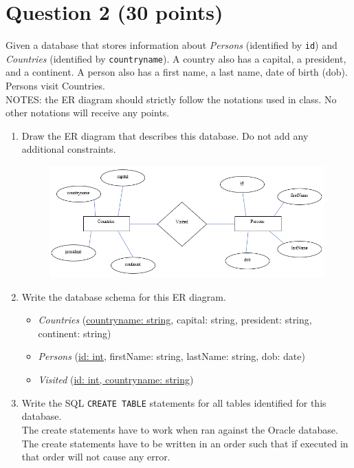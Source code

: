 \documentclass[letterpaper, 11pt]{article}
\begin{document}
\section*{Question 2 (30 points)}

Given a database that stores information about \textit{Persons} (identified by \texttt{id}) and \textit{Countries} (identified by \texttt{countryname}). A country also has a capital, a president, and a continent. A person also has a first name, a last name, date of birth (dob). Persons visit Countries.\\
NOTES: the ER diagram should strictly follow the notations used in class. No other notations will receive any points.

\begin{enumerate}[label={\alph*})]
    \item Draw the ER diagram that describes this database. Do not add any additional constraints.
    \begin{figure}[H]
        \centering
        \includegraphics[scale=0.7]{hw2-2a.png}
    \end{figure}
    \item Write the database schema for this ER diagram.

    \begin{itemize}
        \item \textit{Countries} (\underline{countryname: string}, capital: string, president: string, continent: string)
        \item \textit{Persons} (\underline{id: int}, firstName: string, lastName: string, dob: date)
        \item \textit{Visited} (\underline{id: int, countryname: string})
    \end{itemize}
    
    \item Write the SQL \texttt{CREATE TABLE} statements for all tables identified for this database.\\
    The create statements have to work when ran against the Oracle database.\\
    The create statements have to be written in an order such that if executed in that order will not cause any error.


\end{enumerate}
\end{document}
